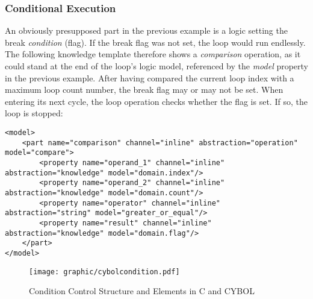 %
%
%
%
%
%
%

\subsubsection{Conditional Execution}
\label{conditional_execution_heading}

An obviously presupposed part in the previous example is a logic setting the
break \emph{condition} (flag). If the break flag was not set, the loop would
run endlessly. The following knowledge template therefore shows a
\emph{comparison} operation, as it could stand at the end of the loop's logic
model, referenced by the \emph{model} property in the previous example. After
having compared the current loop index with a maximum loop count number, the
break flag may or may not be set. When entering its next cycle, the loop
operation checks whether the flag is set. If so, the loop is stopped:

\begin{scriptsize}
    \begin{verbatim}
<model>
    <part name="comparison" channel="inline" abstraction="operation" model="compare">
        <property name="operand_1" channel="inline" abstraction="knowledge" model="domain.index"/>
        <property name="operand_2" channel="inline" abstraction="knowledge" model="domain.count"/>
        <property name="operator" channel="inline" abstraction="string" model="greater_or_equal"/>
        <property name="result" channel="inline" abstraction="knowledge" model="domain.flag"/>
    </part>
</model>
    \end{verbatim}
\end{scriptsize}

\begin{figure}[ht]
    \begin{center}
        \texttt{[image: graphic/cybolcondition.pdf]}
        \caption{Condition Control Structure and Elements in C and CYBOL}
        \label{cybolcondition_figure}
    \end{center}
\end{figure}

